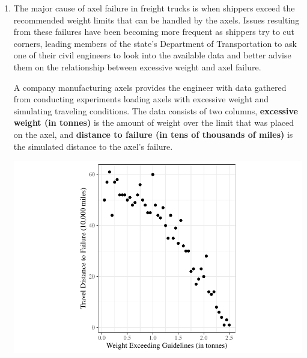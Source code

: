 \documentclass[11pt]{article}\usepackage[]{graphicx}\usepackage[]{color}
\begin{document}
\begin{enumerate}



\item
The major cause of axel failure in freight trucks is when shippers exceed the recommended weight limits that can be handled by the axels. 
Issues resulting from these failures have been becoming more frequent as shippers try to cut corners, 
leading members of the state's Department of Transportation to ask one of their civil engineers 
to look into the available data and better advise them on the relationship between excessive weight and axel failure.

A company manufacturing axels provides the engineer with data gathered from conducting experiments loading axels with excessive weight and simulating traveling conditions.
The data consists of two columns, \textbf{excessive weight (in tonnes)} is the amount of weight over the limit that was placed on the axel, and 
\textbf{distance to failure (in tens of thousands of miles)} is the simulated distance to the axel's failure. 


\begin{center}
\includegraphics{stat305-hw4_sol-003}
\end{center}

% 
% 
% 


\end{enumerate}
\end{document}

